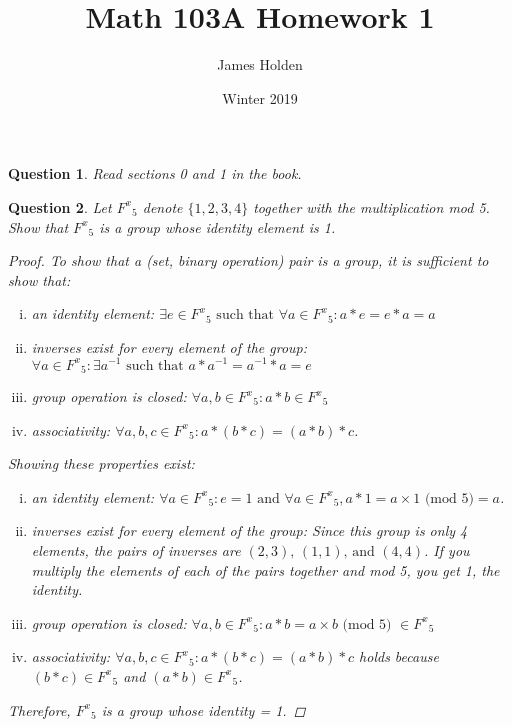 \documentclass{article}
\title{Math 103A Homework 1}
\date{Winter 2019}
\author{James Holden}
\newtheorem{ques}{Question}
\begin{document}
\maketitle

\begin{ques}
	Read sections 0 and 1 in the book.
\end{ques}

\begin{ques} 
	Let ${F^x}_5$ denote $\{1, 2, 3, 4\}$ together with the multiplication mod 5. Show that ${F^x}_5$ is a group whose identity element is 1.
\begin{proof}
	To show that a (set, binary operation) pair is a group, it is sufficient to show that:
	\begin{enumerate}[(i)]
		\item
		an identity element: $\exists e \in {F^x}_5 \text{ such that } \forall a \in {F^x}_5 : a * e = e * a = a$
		\item 
		inverses exist for every element of the group: $\forall a \in {F^x}_5 :  \exists a^{-1}  \text{ such that } a * a^{-1} = a^{-1} * a  = e$
		\item
		group operation is closed: $\forall a, b \in {F^x}_5 : a * b \in {F^x}_5$
		\item 
		associativity:  $\forall a,b,c \in {F^x}_5 : a * (b * c) = (a * b ) * c$.
	\end{enumerate}
	
	Showing these properties exist: 
	
	\begin{enumerate}[(i)]
		\item
		an identity element: $\forall a \in {F^x}_5 : e = 1 \text{ and } \forall a \in {F^x}_5, a * 1 = a \times 1 \text{ (mod 5)} = a$.
		\item 
		inverses exist for every element of the group: Since this group is only 4 elements, the pairs of inverses are $(2, 3) \text{, } (1, 1) \text{, and } (4, 4)$. If you multiply the elements of each of the pairs together and mod 5, you get 1, the identity. 
		\item
		group operation is closed: $\forall a, b \in {F^x}_5 : a * b = a \times b \text{ (mod 5) } \in {F^x}_5$
		\item 
		associativity:  $\forall a,b,c \in {F^x}_5 : a * (b * c) = (a * b ) * c$ holds because $(b * c) \in {F^x}_5$ and $(a * b) \in {F^x}_5$.
	\end{enumerate}

	Therefore, ${F^x}_5$ is a group whose identity = 1.
	 
\end{proof}
\end{ques}
\end{document}
